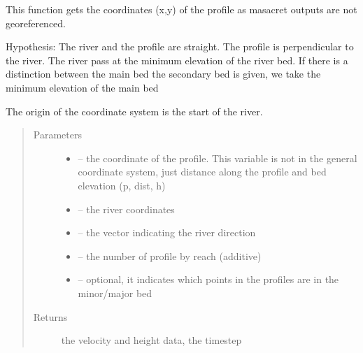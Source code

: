 \documentclass[letterpaper,10pt,english]{sphinxmanual}
\begin{document}

\begin{fulllineitems}
\label{\detokenize{index:src.mascaret.profil_coord_non_georef}}
This function gets the coordinates (x,y) of the profile as masacret outputs are not georeferenced.

Hypothesis: The river and the profile are straight. The profile is perpendicular to the river.
The river pass at the minimum elevation of the river bed. If there is a distinction between the main bed the
secondary bed is given, we take the minimum elevation of the main bed

The origin of the coordinate system is the start of the river.
\begin{quote}\begin{description}
\item[{Parameters}] \leavevmode\begin{itemize}
\item {} 
 -- the coordinate of the profile. This variable is not in the general coordinate system,
just distance along the profile and bed elevation (p, dist, h)

\item {} 
 -- the river coordinates

\item {} 
 -- the vector indicating the river direction

\item {} 
 -- the number of profile by reach (additive)

\item {} 
 -- optional, it indicates which points in the profiles are in the minor/major bed

\end{itemize}

\item[{Returns}] \leavevmode
the velocity and height data, the timestep

\end{description}\end{quote}

\end{fulllineitems}
\end{document}
